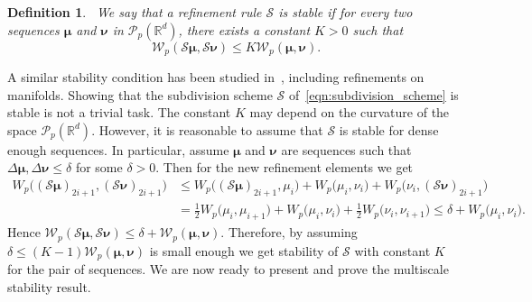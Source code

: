 \documentclass[12pt]{amsart}
\newtheorem{defin}{Definition}[section]
\begin{document}
\begin{defin}~\label{defin:subdivision_stability}
    We say that a refinement rule $\mathcal{S}$ is \emph{stable} if for every two sequences $\boldsymbol{\mu}$ and $\boldsymbol{\nu}$ in $\mathcal{P}_p(\mathbb{R}^d)$, there exists a constant $K>0$ such that
    \begin{equation}~\label{eqn:subdivision_stability}
    \mathcal{W}_p(\mathcal{S}\boldsymbol{\mu},\mathcal{S}\boldsymbol{\nu})\leq K\mathcal{W}_p(\boldsymbol{\mu}, \boldsymbol{\nu}).
    \end{equation}
\end{defin}

A similar stability condition has been studied in~\cite{grohs2010stability}, including refinements on manifolds. Showing that the subdivision scheme $\mathcal{S}$ of~\eqref{eqn:subdivision_scheme} is stable is not a trivial task. The constant $K$ may depend on the curvature of the space $\mathcal{P}_p(\mathbb{R}^d)$. However, it is reasonable to assume that $\mathcal{S}$ is stable for dense enough sequences. In particular, assume $\boldsymbol{\mu}$ and $\boldsymbol{\nu}$ are  sequences such that $\Delta\boldsymbol{\mu}, \Delta\boldsymbol{\nu}\leq \delta$ for some $\delta>0$. Then for the new refinement elements we get
\begin{align*}
    W_p\big((\mathcal{S}\boldsymbol{\mu})_{2i+1}, (\mathcal{S}\boldsymbol{\nu})_{2i+1}\big) & \leq W_p\big((\mathcal{S}\boldsymbol{\mu})_{2i+1}, \mu_{i}\big) + W_p\big(\mu_{i}, \nu_{i}\big) + W_p\big(\nu_{i}, (\mathcal{S}\boldsymbol{\nu})_{2i+1}\big)
    \\ & = \frac{1}{2}W_p\big(\mu_i, \mu_{i+1}\big) + W_p\big(\mu_i, \nu_i\big) + \frac{1}{2}W_p\big( \nu_i, \nu_{i+1}\big) \leq \delta + W_p\big(\mu_i, \nu_i\big).
\end{align*}
Hence $\mathcal{W}_p(\mathcal{S}\boldsymbol{\mu}, \mathcal{S}\boldsymbol{\nu})\leq \delta + \mathcal{W}_p(\boldsymbol{\mu}, \boldsymbol{\nu})$. Therefore, by assuming $\delta\leq (K-1)\mathcal{W}_p(\boldsymbol{\mu},\boldsymbol{\nu})$ is small enough we get stability of $\mathcal{S}$ with constant $K$ for the pair of sequences. We are now ready to present and prove the multiscale stability result.
\end{document}
